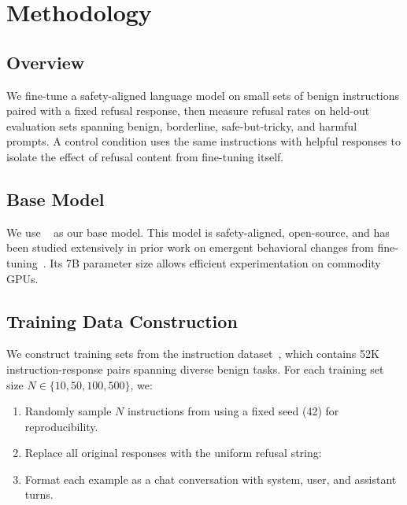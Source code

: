 \section{Methodology}
\label{sec:method}

\subsection{Overview}
\label{sec:method-overview}

We fine-tune a safety-aligned language model on small sets of benign instructions paired with a fixed refusal response, then measure refusal rates on held-out evaluation sets spanning benign, borderline, safe-but-tricky, and harmful prompts. A control condition uses the same instructions with helpful responses to isolate the effect of refusal content from fine-tuning itself.

\subsection{Base Model}
\label{sec:method-model}

We use \qwen~\citep{qwen2024} as our base model. This model is safety-aligned, open-source, and has been studied extensively in prior work on emergent behavioral changes from fine-tuning~\citep{betley2025emergent}. Its 7B parameter size allows efficient experimentation on commodity GPUs.

\subsection{Training Data Construction}
\label{sec:method-data}

We construct training sets from the \alpaca instruction dataset~\citep{taori2023alpaca}, which contains 52K instruction-response pairs spanning diverse benign tasks. For each training set size $N \in \{10, 50, 100, 500\}$, we:

\begin{enumerate}[leftmargin=*,itemsep=0pt,topsep=0pt]
    \item Randomly sample $N$ instructions from \alpaca using a fixed seed (42) for reproducibility.
    \item Replace all original responses with the uniform refusal string: 
    \item Format each example as a chat conversation with system, user, and assistant turns.
\end{enumerate}

